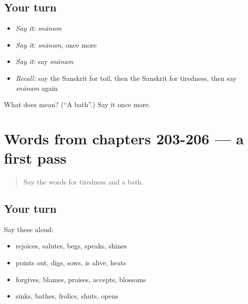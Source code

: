 \subsection*{Your turn}
\begin{itemize}
\raggedright
  \item \emph{Say it:} \emph{snānam}
  \item \emph{Say it:} \emph{snānam}, once more
  \item \emph{Say it:} say \emph{snānam}
  \item \emph{Recall:} say the Sanskrit for toil, then the Sanskrit for tiredness, then say \emph{snānam} again
\end{itemize}

\begin{tcolorbox}[breakable,colback=teal!4,colframe=teal!35!black,title={Before you move on}]
What does  mean? (\textquotedblleft{}A bath\textquotedblright{}.) Say it once more.
\end{tcolorbox}
\section[(dialogue)]{Words from chapters 203-206 — a first pass}

\label{lesson:SA-R211-first-pass-words-from-chapters-203-206}



\begin{quote}
Say the words for tiredness and a bath.
\end{quote}

\subsection*{Your turn}
Say these aloud:

\begin{itemize}
\raggedright
  \item rejoices, salutes, begs, speaks, shines
  \item points out, digs, sows, is alive, heats
  \item forgives, blames, praises, accepts, blossoms
  \item sinks, bathes, frolics, shuts, opens
\end{itemize}

